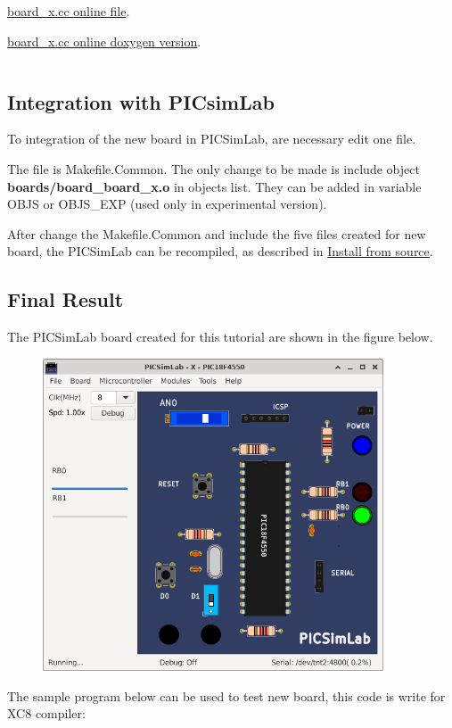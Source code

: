 \href{https://github.com/lcgamboa/picsimlab/blob/master/src/boards/board_x.cc}{ board\_x.cc online file}.

\href{https://lcgamboa.github.io/picsimlab_docs/devel/html/index.html#bcode}{ board\_x.cc online doxygen version}.

\inputminted[baselinestretch=1.2,fontsize=\footnotesize,linenos]{c++}{files/board_x.cc}


\subsection{Integration with PICsimLab}

To integration of the new board in PICSimLab, are necessary edit one file.

The file is Makefile.Common. The only change to be made is include object \textbf{boards/board\_board\_x.o} in 
 objects list. They can be added in variable OBJS or OBJS\_EXP (used only in experimental version).

After change the Makefile.Common and include the five files created for new board, the PICSimLab can be recompiled,
as described in \hyperlink{def:isource}{Install from source}.


\subsection{Final Result}

The PICSimLab board created for this tutorial are shown in the figure below.
\begin{figure}[H]
\center
\includegraphics[width=0.9\textwidth]{img/hb/final.png} 
\end{figure} 

The sample program below can be used to test new board, this code is write for XC8 compiler:
\inputminted[baselinestretch=1.2,fontsize=\footnotesize,linenos]{c}{sample/board_x.c}

